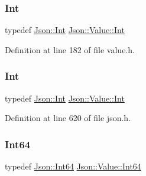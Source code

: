 \hypertarget{class_json_1_1_value_abdf7a7ff73eb130ffcab28504ffdb405}{}\label{class_json_1_1_value_abdf7a7ff73eb130ffcab28504ffdb405} 
\subsubsection{\texorpdfstring{Int}{Int}\hspace{0.1cm}{\footnotesize\ttfamily [1/2]}}
{\footnotesize\ttfamily typedef \hyperlink{namespace_json_a08122e8005b706d982e48cca1e2119c7}{Json\+::\+Int} \hyperlink{class_json_1_1_value_abdf7a7ff73eb130ffcab28504ffdb405}{Json\+::\+Value\+::\+Int}}



Definition at line 182 of file value.\+h.

\hypertarget{class_json_1_1_value_abdf7a7ff73eb130ffcab28504ffdb405}{}\label{class_json_1_1_value_abdf7a7ff73eb130ffcab28504ffdb405} 
\subsubsection{\texorpdfstring{Int}{Int}\hspace{0.1cm}{\footnotesize\ttfamily [2/2]}}
{\footnotesize\ttfamily typedef \hyperlink{namespace_json_a08122e8005b706d982e48cca1e2119c7}{Json\+::\+Int} \hyperlink{class_json_1_1_value_abdf7a7ff73eb130ffcab28504ffdb405}{Json\+::\+Value\+::\+Int}}



Definition at line 620 of file json.\+h.

\hypertarget{class_json_1_1_value_a1b86af9f85f0f1baa972c3319fa22695}{}\label{class_json_1_1_value_a1b86af9f85f0f1baa972c3319fa22695} 
\subsubsection{\texorpdfstring{Int64}{Int64}\hspace{0.1cm}{\footnotesize\ttfamily [1/2]}}
{\footnotesize\ttfamily typedef \hyperlink{namespace_json_ac62566f36fd33115957b91305c9ed1dc}{Json\+::\+Int64} \hyperlink{class_json_1_1_value_a1b86af9f85f0f1baa972c3319fa22695}{Json\+::\+Value\+::\+Int64}}



